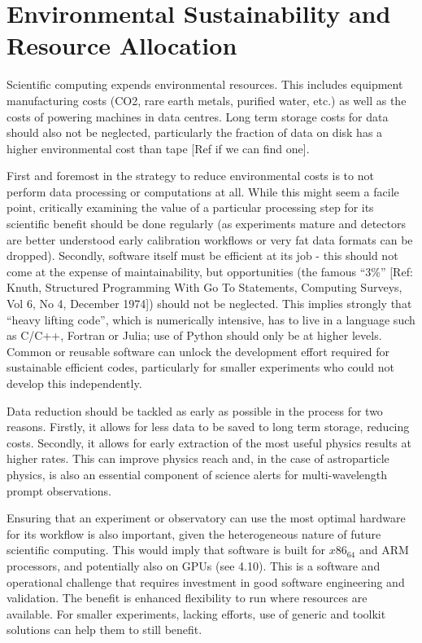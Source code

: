 \section{Environmental Sustainability and Resource Allocation}

Scientific computing expends environmental resources. This includes equipment manufacturing costs (CO2, rare earth metals, purified water, etc.) as well as the costs of powering machines in data centres. Long term storage costs for data should also not be neglected, particularly the fraction of data on disk has a higher environmental cost than tape [Ref if we can find one]. 

First and foremost in the strategy to reduce environmental costs is to not perform data processing or computations at all. While this might seem a facile point, critically examining the value of a particular processing step for its scientific benefit should be done regularly (as experiments mature and detectors are better understood early calibration workflows or very fat data formats can be dropped). Secondly, software itself must be efficient at its job - this should not come at the expense of maintainability, but opportunities (the famous “3\%” [Ref: Knuth, Structured Programming With Go To Statements, Computing Surveys, Vol 6, No 4, December 1974]) should not be neglected. This implies strongly that “heavy lifting code”, which is numerically intensive, has to live in a language such as C/C++, Fortran or Julia; use of Python should only be at higher levels. Common or reusable software can unlock the development effort required for sustainable efficient codes, particularly for smaller experiments who could not develop this independently.

Data reduction should be tackled as early as possible in the process for two reasons. Firstly, it allows for less data to be saved to long term storage, reducing costs. Secondly, it allows for early extraction of the most useful physics results at higher rates. This can improve physics reach and, in the case of astroparticle physics, is also an essential component of science alerts for multi-wavelength prompt observations.

Ensuring that an experiment or observatory can use the most optimal hardware for its workflow is also important, given the heterogeneous nature of future scientific computing. This would imply that software is built for $x86_64$ and ARM processors, and potentially also on GPUs (see 4.10). This is a software and operational challenge that requires investment in good software engineering and validation. The benefit is enhanced flexibility to run where resources are available. For smaller experiments, lacking efforts, use of generic and toolkit solutions can help them to still benefit.

